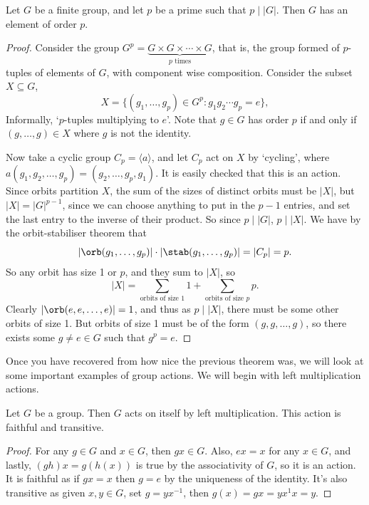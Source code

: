 \begin{theorem}
	Let $G$ be a finite group, and let $p$ be a prime such that $p \mid |G|$. Then $G$ has an element of order $p$.
\end{theorem}
\begin{proof}
	Consider the group $G^p = \underbrace{G\times G \times \cdots \times G}_{p\text{ times}}$, that is, the group formed of $p$-tuples of elements of $G$, with component wise composition. Consider the subset $X \subseteq G$,
	$$
	X = \{(g_1, \dots, g_p) \in G^p : g_1 g_2 \cdots g_p = e\},
	$$
	Informally, `$p$-tuples multiplying to $e$'. Note that $g \in G$ has order $p$ if and only if $(g, \dots, g) \in X$ where $g$ is not the identity.

	Now take a cyclic group $C_p = \langle a \rangle$, and let $C_p$ act on $X$ by `cycling', where $a(g_1, g_2, \dots, g_p) = (g_2, \dots, g_p, g_1)$. It is easily checked that this is an action.
	Since orbits partition $X$, the sum of the sizes of distinct orbits must be $|X|$, but $|X| = |G|^{p - 1}$, since we can choose anything to put in the $p - 1$ entries, and set the last entry to the inverse of their product. So since $p \mid |G|$, $p \mid |X|$. We have by the orbit-stabiliser theorem that
	$$
	|\orb(g_1, \dots, g_p)| \cdot |\stab(g_1, \dots, g_p)| = |C_p| = p.
	$$
	So any orbit has size 1 or $p$, and they sum to $|X|$, so
	$$
	|X| = \sum_{\text{orbits of size 1}} 1 + \sum_{\text{orbits of size $p$}} p.
	$$
	Clearly $|\orb(e, e, \dots, e)| = 1$, and thus as $p \mid |X|$, there must be some other orbits of size 1.
	But orbits of size 1 must be of the form $(g, g, \dots, g)$, so there exists some $g \neq e \in G$ such that $g^p = e$.
\end{proof}


Once you have recovered from how nice the previous theorem was, we will look at some important examples of group actions. We will begin with left multiplication actions.

\begin{lemma}
	Let $G$ be a group. Then $G$ acts on itself by left multiplication. This action is faithful and transitive.
\end{lemma}
\begin{proof}
	For any $g \in G$ and $x \in G$, then $gx \in G$. Also, $ex = x$ for any $x \in G$, and lastly, $(gh)x = g(h(x))$ is true by the associativity of $G$, so it is an action. It is faithful as if $gx = x$ then $g = e$ by the uniqueness of the identity. It's also transitive as given $x, y \in G$, set $g = yx^{-1}$, then $g(x) = gx = yx^{1}x = y$. 
\end{proof}

